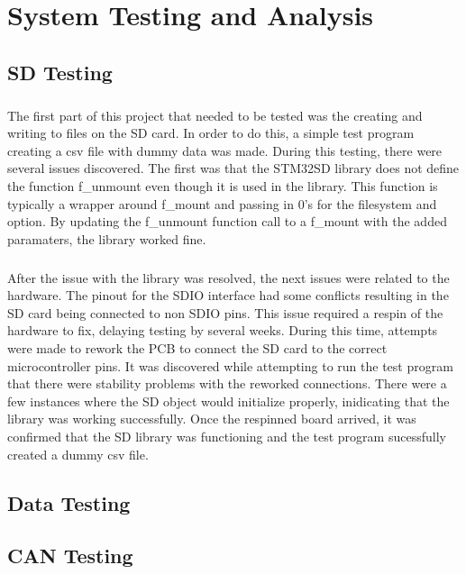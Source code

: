 \chapter{System Testing and Analysis}

\section{SD Testing}

\paragraph{}
The first part of this project that needed to be tested was the creating and writing to files on the SD card.
In order to do this, a simple test program creating a csv file with dummy data was made.
During this testing, there were several issues discovered.
The first was that the STM32SD library does not define the function f\_unmount even though it is used in the library.
This function is typically a wrapper around f\_mount and passing in 0's for the filesystem and option.
By updating the f\_unmount function call to a f\_mount with the added paramaters, the library worked fine.

\paragraph{}
After the issue with the library was resolved, the next issues were related to the hardware.
The pinout for the SDIO interface had some conflicts resulting in the SD card being connected to non SDIO pins.
This issue required a respin of the hardware to fix, delaying testing by several weeks.
During this time, attempts were made to rework the PCB to connect the SD card to the correct microcontroller pins.
It was discovered while attempting to run the test program that there were stability problems with the reworked connections.
There were a few instances where the SD object would initialize properly, inidicating that the library was working successfully.
Once the respinned board arrived, it was confirmed that the SD library was functioning and the test program sucessfully created a dummy csv file.

\section{Data Testing}

\section{CAN Testing}

